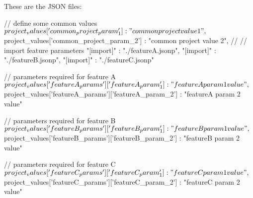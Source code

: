
\newpage

These are the JSON files:

\vspace{2ex}

\textbullet {}

\begin{pythoncode}
{
   // define some common values
   ${project_values}['common_project_param_1'] : "common project value 1",
   ${project_values}['common_project_param_2'] : "common project value 2",
   //
   // import feature parameters
   "[import]" : "./featureA.jsonp",
   "[import]" : "./featureB.jsonp",
   "[import]" : "./featureC.jsonp"
}
\end{pythoncode}

\vspace{2ex}

\textbullet {}

\begin{pythoncode}
{
   // parameters required for feature A
   ${project_values}['featureA_params']['featureA_param_1'] : "featureA param 1 value",
   ${project_values}['featureA_params']['featureA_param_2'] : "featureA param 2 value"
}
\end{pythoncode}

\vspace{2ex}

\textbullet {}

\begin{pythoncode}
{
   // parameters required for feature B
   ${project_values}['featureB_params']['featureB_param_1'] : "featureB param 1 value",
   ${project_values}['featureB_params']['featureB_param_2'] : "featureB param 2 value"
}
\end{pythoncode}

\vspace{2ex}

\textbullet {}

\begin{pythoncode}
{
   // parameters required for feature C
   ${project_values}['featureC_params']['featureC_param_1'] : "featureC param 1 value",
   ${project_values}['featureC_params']['featureC_param_2'] : "featureC param 2 value"
}
\end{pythoncode}

\vspace{2ex}

